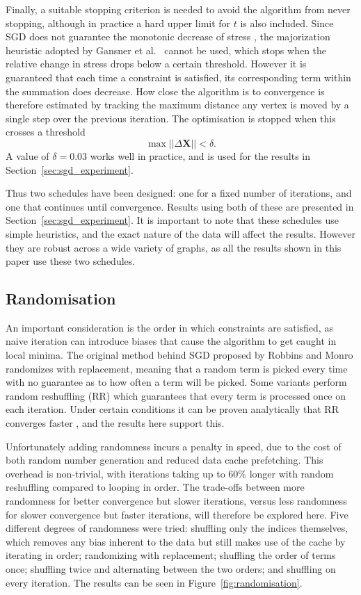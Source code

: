 Finally, a suitable stopping criterion is needed to avoid the algorithm from never stopping, although in practice a hard upper limit for $t$ is also included. Since SGD does not guarantee the monotonic decrease of stress \cite{Darken1992}, the majorization heuristic adopted by Gansner et al.\ \cite{Gansner2004} cannot be used, which stops when the relative change in stress drops below a certain threshold.
However it is guaranteed that each time a constraint is satisfied, its corresponding term within the summation does decrease.
How close the algorithm is to convergence is therefore estimated by tracking the maximum distance any vertex is moved by a single step over the previous iteration. The optimisation is stopped when this crosses a threshold
\begin{equation}
  \max||\Delta\mathbf{X}|| < \delta.
\end{equation}
A value of $\delta=0.03$ works well in practice, and is used for the results in Section~\ref{sec:sgd_experiment}.

Thus two schedules have been designed: one for a fixed number of iterations, and one that continues until convergence.
Results using both of these are presented in Section~\ref{sec:sgd_experiment}.
It is important to note that these schedules use simple heuristics, and the exact nature of the data will affect the results.
However they are robust across a wide variety of graphs, as all the results shown in this paper use these two schedules.

\subsection{Randomisation}
\label{sec:randomisation}
An important consideration is the order in which constraints are satisfied, as naive iteration can introduce biases that cause the algorithm to get caught in local minima.
The original method behind SGD proposed by Robbins and Monro \cite{Robbins1951} randomizes with replacement, meaning that a random term is picked every time with no guarantee as to how often a term will be picked. Some variants perform random reshuffling (RR) which guarantees that every term is processed once on each iteration. Under certain conditions it can be proven analytically that RR converges faster \cite{Gurbuzbalaban2019}, and the results here support this.

Unfortunately adding randomness incurs a penalty in speed, due to the cost of both random number generation and reduced data cache prefetching.
This overhead is non-trivial, with iterations taking up to 60\% longer with random reshuffling compared to looping in order. 
The trade-offs between more randomness for better convergence but slower iterations, versus less randomness for slower convergence but faster iterations, will therefore be explored here.
Five different degrees of randomness were tried: shuffling only the indices themselves, which removes any bias inherent to the data but still makes use of the cache by iterating in order; randomizing with replacement; shuffling the order of terms once; shuffling twice and alternating between the two orders; and shuffling on every iteration.
The results can be seen in Figure~\ref{fig:randomisation}.


